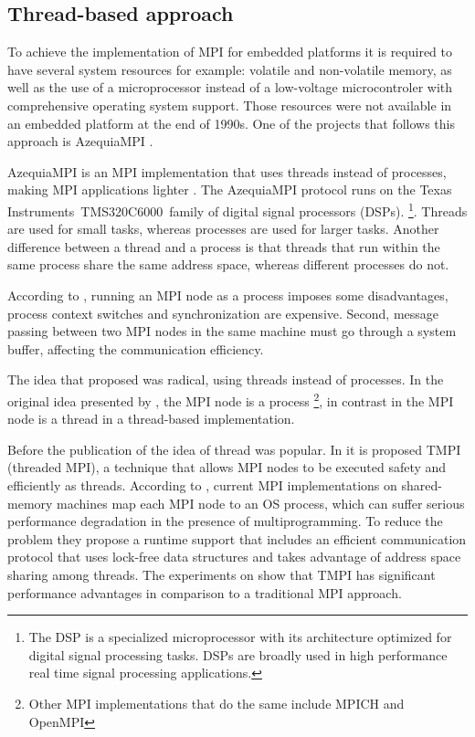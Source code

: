 
\subsection{Thread-based approach}

To achieve the implementation of MPI for embedded platforms it is required to
have several system resources for example: volatile and non-volatile memory, as
well as the use of a microprocessor instead of a low-voltage microcontroler
with comprehensive operating system support. Those resources were not available
in an embedded platform at the end of 1990s.  One of the projects that follows
this approach is AzequiaMPI \cite{Gallego}.

AzequiaMPI is an MPI implementation that uses threads instead of processes,
making MPI applications lighter . The AzequiaMPI protocol runs on the Texas
Instruments\textregistered\ TMS320C6000\textregistered\ family of digital
signal processors (DSPs). \footnote{The DSP is a specialized microprocessor
with its architecture optimized for digital signal processing tasks. DSPs are
broadly used in high performance real time signal processing applications.}.
Threads are used for small tasks, whereas processes are used for larger tasks.
Another difference between a thread and a process is that threads that run
within the same process share the same address space, whereas different
processes do not.

According to \cite{Gallego}, running an MPI node as a process imposes some
disadvantages, process context switches and synchronization are expensive.
Second, message passing between two MPI nodes in the same machine must go
through a system buffer, affecting  the communication efficiency. 

The idea that \cite{Gallego} proposed was radical, using threads instead of
processes. In the original idea presented by \cite{Salim}, the MPI node  is a
process \footnote{Other MPI implementations that do the same include MPICH and
OpenMPI}, in contrast in \cite{Gallego} the MPI node is a thread in a
thread-based implementation.

Before the publication of \cite{Gallego} the idea of thread was popular.  In
\cite{Tang} it is proposed TMPI (threaded MPI), a technique that  allows MPI
nodes to be executed safety and efficiently as threads. According to
\cite{Tang}, current MPI implementations on shared-memory machines map each MPI
node to an OS process, which can suffer serious performance degradation in the
presence of multiprogramming. To reduce the problem they propose a runtime
support that includes an efficient communication protocol that uses lock-free
data structures and takes advantage of address space sharing among threads. The
experiments on \cite{Tang} show that TMPI has significant performance
advantages in comparison to a traditional MPI approach.

